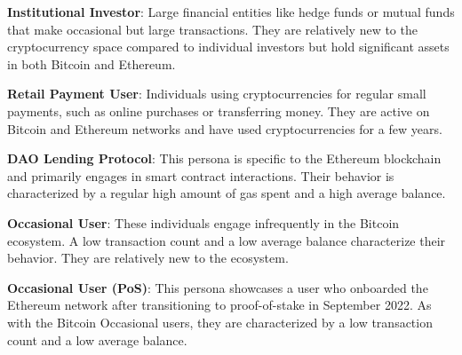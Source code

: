 \documentclass[11pt]{report}
\begin{document}
\textbf{Institutional Investor}: Large financial entities like hedge funds or mutual funds that make occasional but large transactions. They are relatively new to the cryptocurrency space compared to individual investors but hold significant assets in both Bitcoin and Ethereum.

\textbf{Retail Payment User}: Individuals using cryptocurrencies for regular small payments, such as online purchases or transferring money. They are active on Bitcoin and Ethereum networks and have used cryptocurrencies for a few years.

\textbf{DAO Lending Protocol}: This persona is specific to the Ethereum blockchain and primarily engages in smart contract interactions. Their behavior is characterized by a regular high amount of gas spent and a high average balance.

\textbf{Occasional User}: These individuals engage infrequently in the Bitcoin ecosystem. A low transaction count and a low average balance characterize their behavior. They are relatively new to the ecosystem.

\textbf{Occasional User (PoS)}: This persona showcases a user who onboarded the Ethereum network after transitioning to proof-of-stake in September 2022. As with the Bitcoin Occasional users, they are characterized by a low transaction count and a low average balance.

\end{document}
